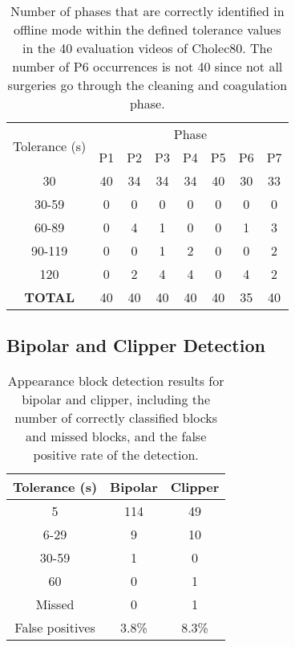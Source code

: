 \documentclass[journal]{IEEEtran} \usepackage{amssymb}
\begin{document}
\begin{table}
\begin{centering}
\begin{tabular}{|c|c|c|c|c|c|c|c|}
\hline 
\multirow{2}{*}{Tolerance (s)} & \multicolumn{7}{c|}{Phase}\tabularnewline
\cline{2-8} 
 & P1 & P2 & P3 & P4 & P5 & P6 & P7\tabularnewline
\hline 
\hline 
30 & 40 & 34 & 34 & 34 & 40 & 30 & 33\tabularnewline
\hline 
30-59 & 0 & 0 & 0 & 0 & 0 & 0 & 0\tabularnewline
\hline 
60-89 & 0 & 4 & 1 & 0 & 0 & 1 & 3\tabularnewline
\hline 
90-119 & 0 & 0 & 1 & 2 & 0 & 0 & 2\tabularnewline
\hline 
120 & 0 & 2 & 4 & 4 & 0 & 4 & 2\tabularnewline
\hline 
\textbf{TOTAL} & 40 & 40 & 40 & 40 & 40 & 35 & 40\tabularnewline
\hline 
\end{tabular}
\par\end{centering}

\caption{Number of phases that are correctly identified in offline mode within the defined tolerance values in the 40 evaluation videos of Cholec80. The number of P6 occurrences is not 40 since not all surgeries go through the cleaning and coagulation phase. \label{tab:offline-error-second}}
\end{table}



\subsection{Bipolar and Clipper Detection}

\begin{table}
\begin{centering}
\begin{tabular}{|c|c|c|}
\hline 
Tolerance (s) & Bipolar & Clipper\tabularnewline
\hline 
\hline 
5 & 114 & 49\tabularnewline
\hline 
6-29 & 9 & 10\tabularnewline
\hline 
30-59 & 1 & 0\tabularnewline
\hline 
60 & 0 & 1\tabularnewline
\hline 
Missed & 0 & 1\tabularnewline
\hline 
False positives & 3.8\% & 8.3\%\tabularnewline
\hline 
\end{tabular}
\par\end{centering}

\caption{Appearance block detection results for bipolar and clipper, including the number of correctly classified blocks and missed blocks, and the false positive rate of the detection. \label{tab:block-detection} }
\end{table}
\end{document}
